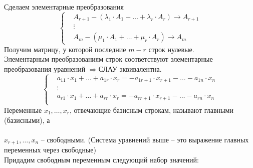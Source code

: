 \documentclass[a4paper,12pt]{article}
\begin{document}
Сделаем элементарные преобразования\
\[\left\{
\begin{aligned}
&A_{r+1}-(\lambda_1\cdot A_1+\ldots+\lambda_r\cdot A_r)\rightarrow A_{r+1}\\
&\vdots\\
&A_m-(\mu_1\cdot A_1+\ldots+\mu_r\cdot A_r)\rightarrow A_m
\end{aligned}\right.
\]
Получим матрицу, у которой последние $m-r$ строк нулевые.\\
Элементарным преобразованиям строк соответствуют элементарные преобразования уравнений $\Rightarrow$СЛАУ эквивалентна.\\
\[\left\{
\begin{aligned}
&a_{11}\cdot x_1+\ldots+a_{1r}\cdot x_r=-a_{1r+1}\cdot x_{r+1}-\ldots-a_{1n}\cdot x_n\\
&\vdots\\
&a_{r1}\cdot x_1+\ldots+a_{rr}\cdot x_r=-a_{rr+1}\cdot x_{r+1}-\ldots-a_{rn}\cdot x_n\\
\end{aligned}\right.
\]
Переменные $x_1, \ldots, x_r$, отвечающие базисным строкам, называют главными (базисными), а\\
\\
$x_{r+1}, \ldots, x_n$ -- свободными. (Система уравнений выше -- это выражение главных переменных через свободные)\\
Придадим свободным переменным следующий набор значений:
\end{document}
